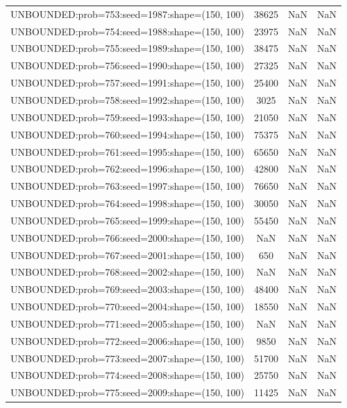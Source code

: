 \begin{longtable}{lccc}
UNBOUNDED:prob=753:seed=1987:shape=(150, 100) & 38625 &   NaN &    NaN \\
UNBOUNDED:prob=754:seed=1988:shape=(150, 100) & 23975 &   NaN &    NaN \\
UNBOUNDED:prob=755:seed=1989:shape=(150, 100) & 38475 &   NaN &    NaN \\
UNBOUNDED:prob=756:seed=1990:shape=(150, 100) & 27325 &   NaN &    NaN \\
UNBOUNDED:prob=757:seed=1991:shape=(150, 100) & 25400 &   NaN &    NaN \\
UNBOUNDED:prob=758:seed=1992:shape=(150, 100) &  3025 &   NaN &    NaN \\
UNBOUNDED:prob=759:seed=1993:shape=(150, 100) & 21050 &   NaN &    NaN \\
UNBOUNDED:prob=760:seed=1994:shape=(150, 100) & 75375 &   NaN &    NaN \\
UNBOUNDED:prob=761:seed=1995:shape=(150, 100) & 65650 &   NaN &    NaN \\
UNBOUNDED:prob=762:seed=1996:shape=(150, 100) & 42800 &   NaN &    NaN \\
UNBOUNDED:prob=763:seed=1997:shape=(150, 100) & 76650 &   NaN &    NaN \\
UNBOUNDED:prob=764:seed=1998:shape=(150, 100) & 30050 &   NaN &    NaN \\
UNBOUNDED:prob=765:seed=1999:shape=(150, 100) & 55450 &   NaN &    NaN \\
UNBOUNDED:prob=766:seed=2000:shape=(150, 100) &   NaN &   NaN &    NaN \\
UNBOUNDED:prob=767:seed=2001:shape=(150, 100) &   650 &   NaN &    NaN \\
UNBOUNDED:prob=768:seed=2002:shape=(150, 100) &   NaN &   NaN &    NaN \\
UNBOUNDED:prob=769:seed=2003:shape=(150, 100) & 48400 &   NaN &    NaN \\
UNBOUNDED:prob=770:seed=2004:shape=(150, 100) & 18550 &   NaN &    NaN \\
UNBOUNDED:prob=771:seed=2005:shape=(150, 100) &   NaN &   NaN &    NaN \\
UNBOUNDED:prob=772:seed=2006:shape=(150, 100) &  9850 &   NaN &    NaN \\
UNBOUNDED:prob=773:seed=2007:shape=(150, 100) & 51700 &   NaN &    NaN \\
UNBOUNDED:prob=774:seed=2008:shape=(150, 100) & 25750 &   NaN &    NaN \\
UNBOUNDED:prob=775:seed=2009:shape=(150, 100) & 11425 &   NaN &    NaN \\

\end{longtable}
